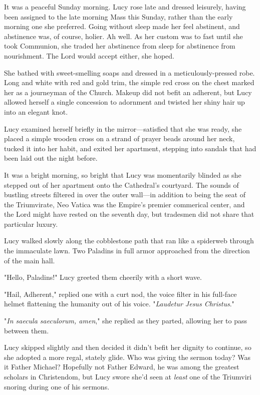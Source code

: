 It was a peaceful Sunday morning.  Lucy rose late and dressed leisurely, having
been assigned to the late morning Mass this Sunday, rather than the early
morning one she preferred.  Going without sleep made her feel abstinent, and
abstinence was, of course, holier.  Ah well.  As her custom was to fast until
she took Communion, she traded her abstinence from sleep for abstinence from
nourishment.  The Lord would accept either, she hoped.

She bathed with sweet-smelling soaps and dressed in a meticulously-pressed
robe.  Long and white with red and gold trim, the simple red cross on the chest
marked her as a journeyman of the Church.  Makeup did not befit an adherent,
but Lucy allowed herself a single concession to adornment and twisted her shiny
hair up into an elegant knot.

Lucy examined herself briefly in the mirror---satisfied that she was ready, she
placed a simple wooden cross on a strand of prayer beads around her neck,
tucked it into her habit, and exited her apartment, stepping into sandals that
had been laid out the night before.

It was a bright morning, so bright that Lucy was momentarily blinded as she
stepped out of her apartment onto the Cathedral's courtyard.  The sounds of
bustling streets filtered in over the outer wall---in addition to being the
seat of the Triumvirate, Neo Vatica was the Empire's premier commerical center,
and the Lord might have rested on the seventh day, but tradesmen did not share
that particular luxury.

Lucy walked slowly along the cobblestone path that ran like a spiderweb through
the immaculate lawn.  Two Paladins in full armor approached from the direction
of the main hall.

"Hello, Paladins!"  Lucy greeted them cheerily with a short wave.

"Hail, Adherent," replied one with a curt nod, the voice filter in his
full-face helmet flattening the humanity out of his voice. "\textit{Laudetur
Jesus Christus}."

"\textit{In saecula saeculorum, amen}," she replied as they parted, allowing
her to pass between them.

Lucy skipped slightly and then decided it didn't befit her dignity to continue,
so she adopted a more regal, stately glide. Who was giving the sermon today?
Was it Father Michael? Hopefully not Father Edward, he was among the greatest
scholars in Christendom, but Lucy swore she'd seen at \textit{least} one of the
Triumviri snoring during one of his sermons.

